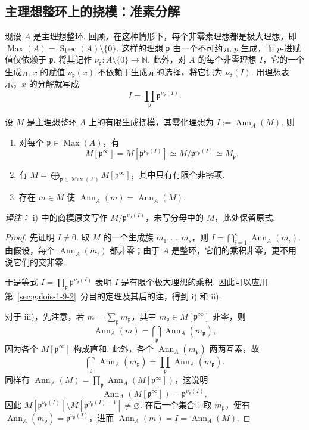 \subsection{主理想整环上的挠模：准素分解}\label{sec:galois-1-10-2}
现设 $A$ 是主理想整环. 回顾，在这种情形下，每个非零素理想都是极大理想，即 $\operatorname{Max}(A)=\operatorname{Spec}(A)\setminus\{0\}$. 这样的理想 $\mathfrak p$ 由一个不可约元 $p$ 生成，而 $p$-进赋值仅依赖于 $\mathfrak p$. 将其记作 $\nu_{\mathfrak p}\colon A\setminus\{0\}\longrightarrow\mathbb N$. 此外，对 $A$ 的每个非零理想 $I$，它的一个生成元 $x$ 的赋值 $\nu_{\mathfrak p}(x)$ 不依赖于生成元的选择，将它记为 $\nu_{\mathfrak p}(I)$. 用理想表示，$x$ 的分解就写成
\[I=\prod_{\mathfrak p}\mathfrak p^{\nu_{\mathfrak p}(I)}.\]
\begin{proposition*}
设 $M$ 是主理想整环 $A$ 上的有限生成挠模，其零化理想为 $I:=\operatorname{Ann}_A(M)$. 则
\begin{enumerate}[label=\roman*)]
\item 对每个 $\mathfrak p\in\operatorname{Max}(A)$，有
\[M[\mathfrak p^\infty]=M[\mathfrak p^{\nu_{\mathfrak p}(I)}]\simeq M/\mathfrak p^{\nu_{\mathfrak p}(I)}\simeq M_{\mathfrak p}.\]
\item 有 $M=\bigoplus_{\mathfrak p\in\operatorname{Max}(A)}M[\mathfrak p^\infty]$，其中只有有限个非零项.
\item 存在 $m\in M$ 使 $\operatorname{Ann}_A(m)=\operatorname{Ann}_A(M)$.
\end{enumerate}
\end{proposition*}
\noindent\textit{译注：} i) 中的商模原文写作 $M/\mathfrak p^{\nu_{\mathfrak p}(I)}$，未写分母中的 $M$，此处保留原式.
\begin{proof}
先证明 $I\ne0$. 取 $M$ 的一个生成族 $m_1,\ldots,m_s$，则 $I=\bigcap_{i=1}^s\operatorname{Ann}_A(m_i)$. 由假设，每个 $\operatorname{Ann}_A(m_i)$ 都非零；由于 $A$ 是整环，它们的乘积非零，更不用说它们的交非零.

于是等式 $I=\prod_{\mathfrak p}\mathfrak p^{\nu_{\mathfrak p}(I)}$ 表明 $I$ 是有限个极大理想的乘积. 因此可以应用第~\ref{sec:galois-1-9-2}~分目的定理及其后的注，得到 i) 和 ii).

对于 iii)，先注意，若 $m=\sum_{\mathfrak p}m_{\mathfrak p}$，其中 $m_{\mathfrak p}\in M[\mathfrak p^\infty]$ 非零，则
\[\operatorname{Ann}_A(m)=\bigcap_{\mathfrak p}\operatorname{Ann}_A(m_{\mathfrak p}),\]
因为各个 $M[\mathfrak p^\infty]$ 构成直和. 此外，各个 $\operatorname{Ann}_A(m_{\mathfrak p})$ 两两互素，故
\[\bigcap_{\mathfrak p}\operatorname{Ann}_A(m_{\mathfrak p})=\prod_{\mathfrak p}\operatorname{Ann}_A(m_{\mathfrak p}).\]
同样有 $\operatorname{Ann}_A(M)=\prod_{\mathfrak p}\operatorname{Ann}_A(M[\mathfrak p^\infty])$，这说明
\[\operatorname{Ann}_A(M[\mathfrak p^\infty])=\mathfrak p^{\nu_{\mathfrak p}(I)},\]
因此 $M[\mathfrak p^{\nu_{\mathfrak p}(I)}]\setminus M[\mathfrak p^{\nu_{\mathfrak p}(I)-1}]\ne\varnothing$. 在后一个集合中取 $m_{\mathfrak p}$，便有 $\operatorname{Ann}_A(m_{\mathfrak p})=\mathfrak p^{\nu_{\mathfrak p}(I)}$，进而 $\operatorname{Ann}_A(m)=I=\operatorname{Ann}_A(M)$.
\end{proof}

